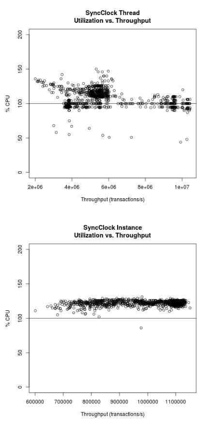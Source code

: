 \begin{figure}
\center
\includegraphics[height=.4\textheight]{sync_thread_throughput_utilization.png}
\caption{\label{sync_thread_throughput_utilization}}
\end{figure}

\begin{figure}
\center
\includegraphics[height=.4\textheight]{sync_instance_throughput_utilization.png}
\caption{\label{sync_instance_throughput_utilization}}
\end{figure}

